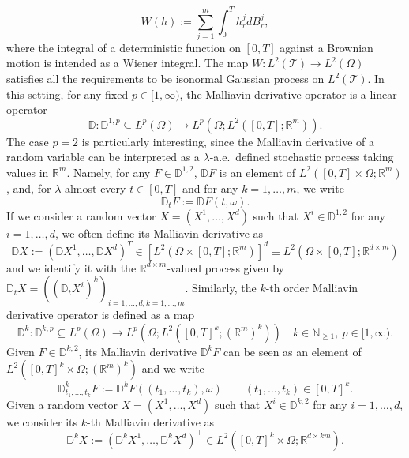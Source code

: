 \documentclass[11pt,a4paper]{article}
\newcommand{\R}{\mathbb{R}}
\theoremstyle{plain}
\begin{document}
\begin{equation*}
    W(h) := \sum_{j=1}^m \int_0^T h^j_r dB^j_r, 
\end{equation*} 
where the integral of a deterministic function on $[0,T]$ against a Brownian motion is intended as a Wiener integral. The map $W:L^2(\mathcal{T}) \to L^2(\Omega)$ satisfies all the requirements to be isonormal Gaussian process on $L^2(\mathcal{T})$. 
In this setting, for any fixed $p\in [1,\infty)$, the Malliavin derivative operator is a linear operator \begin{equation*}
    \mathbb{D}: \mathbb{D}^{1,p} \subseteq L^p(\Omega) \to L^p(\Omega;L^2([0,T];\R^m)).
\end{equation*}
The case $p=2$ is particularly interesting, since the Malliavin derivative of a random variable can be interpreted as a $\lambda$-a.e.\ defined stochastic process taking values in $\R^m$. Namely, for any  $F \in \mathbb{D}^{1,2}$, $\mathbb{D}F$ is an element of $L^2([0,T]\times \Omega;\R^m)$, and, for $\lambda$-almost every $t \in [0,T]$ and for any $k=1,\dots,m$, we write \begin{equation*}
    \mathbb{D}_t F := \mathbb{D}F (t,\omega).
\end{equation*} 
If we consider a random vector $X=(X^1,\dots,X^d)$ such that $X^i\in \mathbb{D}^{1,2}$ for any $i=1,\dots,d$, we often define its Malliavin derivative as \begin{equation*}
    \mathbb{D}X := (\mathbb{D}X^1,\dots,\mathbb{D}X^d)^T \in [L^2(\Omega \times [0,T];\R^m)]^d \equiv L^2(\Omega \times [0,T];\R^{d \times m})
\end{equation*}  
and we identify it with the $\R^{d\times m}$-valued process given by $\mathbb{D}_t X = ((\mathbb{D}_t X^i)^k)_{i=1,\dots,d; k=1,\dots,m}$. 
Similarly, the $k$-th order Malliavin derivative operator is defined as a map \begin{equation*}
    \mathbb{D}^k: \mathbb{D}^{k,p} \subseteq L^p(\Omega) \to L^p(\Omega;L^2([0,T]^k;(\R^{m})^k)) \quad k\in \mathbb{N}_{\ge 1}, \ p\in [1,\infty). 
\end{equation*}  
Given $F\in \mathbb{D}^{k,2}$, its Malliavin derivative $\mathbb{D}^kF$ can be seen as an element of \linebreak $L^2([0,T]^k\times \Omega; (\R^{m})^k)$ and we write \begin{equation*}
    \mathbb{D}^k_{t_1,\dots,t_k}F := \mathbb{D}^k F ((t_1,\dots,t_k),\omega) \qquad (t_1,\dots,t_k) \in [0,T]^k.
\end{equation*}
Given a random vector $X=(X^1,\dots,X^d)$ such that $X^i\in \mathbb{D}^{k,2}$ for any $i=1,\dots,d$, we consider its $k$-th Malliavin derivative as \begin{equation*}
    \mathbb{D}^k X := (\mathbb{D}^kX^1,\dots,\mathbb{D}^kX^d)^\top \in L^2([0,T]^k\times \Omega;\R^{d\times km}).
\end{equation*}
\end{document}
